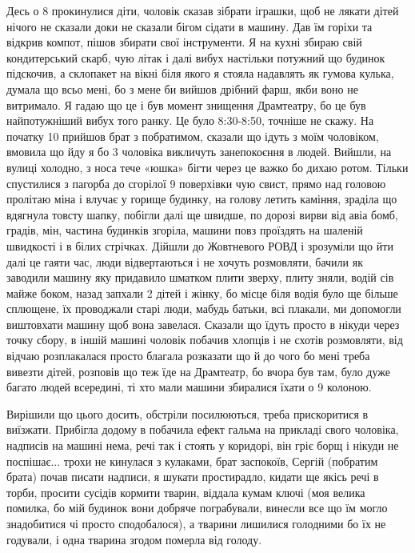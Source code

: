\begin{itemize}
Десь о 8 прокинулися діти, чоловік сказав зібрати іграшки, щоб не лякати дітей
нічого не сказали доки не сказали бігом сідати в машину. Дав їм горіхи та
відкрив компот, пішов збирати свої інструменти. Я на кухні збираю свій
кондитерський скарб, чую літак і далі вибух настільки потужний що будинок
підскочив, а склопакет на вікні біля якого я стояла надавлять як гумова кулька,
думала що всьо мені, бо з мене би вийшов дрібний фарш, якби воно не витримало.
Я гадаю що це і був момент знищення Драмтеатру, бо це був найпотужніший вибух
того ранку. Це було 8:30-8:50, точніше не скажу. На початку 10 прийшов брат з
побратимом, сказали що ідуть з моїм чоловіком, вмовила що йду я бо 3 чоловіка
викличуть занепокоєння в людей. Вийшли, на вулиці холодно, з носа тече «юшка»
бігти через це важко бо дихаю ротом. Тільки спустилися з пагорба до сгорілої 9
поверхівки чую свист, прямо над головою пролітаю міна і влучає у горище
будинку, на голову летить каміння, зраділа що вдягнула товсту шапку, побігли
далі ще швидше, по дорозі вирви від авіа бомб, градів, мін, частина будинків
згоріла, машини повз проїздять на шаленій швидкості і в білих стрічках. Дійшли
до Жовтневого РОВД і зрозуміли що йти далі це гаяти час, люди відвертаються і
не хочуть розмовляти, бачили як заводили машину яку придавило шматком плити
зверху, плиту зняли, водій сів майже боком, назад запхали 2 дітей і жінку, бо
місце біля водія було ще більше сплющене, їх проводжали старі люди, мабудь
батьки, всі плакали, ми допомогли виштовхати машину щоб вона завелася. Сказали
що їдуть просто в нікуди через точку сбору, в іншій машині чоловік побачив
хлопців і не схотів розмовляти, від відчаю розплакалася просто благала
розказати що й до чого бо мені треба вивезти дітей, розповів що теж їде на
Драмтеатр, бо вчора був там, було дуже багато людей всередині, ті хто мали
машини збиралися їхати о 9 колоною.


Вирішили що цього досить, обстріли посилюються, треба прискоритися в виїзжати.
Прибігла додому в побачила ефект гальма на прикладі свого чоловіка, надписів на
машині нема, речі так і стоять у коридорі, він гріє борщ і нікуди не поспішає...
трохи не кинулася з кулаками, брат заспокоїв, Сергій (побратим брата) почав
писати надписи, я шукати простирадло, кидати ще якісь речі в торби, просити
сусідів кормити тварин, віддала кумам ключі (моя велика помилка, бо мій будинок
вони добряче пограбували, винесли все що їм могло знадобитися чі просто
сподобалося), а тварини лишилися голодними бо їх не годували, і одна тварина
згодом померла від голоду.


\end{itemize}
